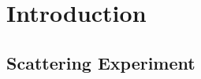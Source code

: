 \documentclass[a5paper,12pt]{book}
\begin{document}

\frontmatter
\tableofcontents
\listoftables
\listoffigures
\clearpage
\mainmatter
\chapter{Introduction}
\section{Scattering Experiment}

\clearpage

\clearpage
{}
\printindex
\end{document}
